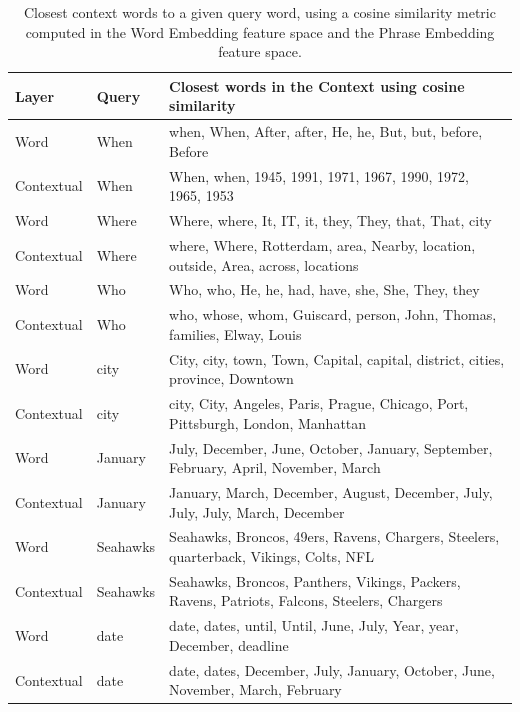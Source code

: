 \begin{table}[]
    \scriptsize
    \centering
    \begin{tabular}{ lll }
        \hline
        \textbf{Layer} & \textbf{Query} & \textbf{Closest words in the Context using cosine similarity} \\
        \hline
        \hline
        Word & When & when, When, After, after, He, he, But, but, before, Before \\
        Contextual & When & When, when, 1945, 1991, 1971, 1967, 1990, 1972, 1965, 1953 \\
        \hline
        Word & Where & Where, where, It, IT, it, they, They, that, That, city \\
        Contextual & Where & where, Where, Rotterdam, area, Nearby, location, outside, Area, across, locations \\
        \hline
        Word & Who & Who, who, He, he, had, have, she, She, They, they \\
        Contextual & Who & who, whose, whom, Guiscard, person, John, Thomas, families, Elway, Louis \\
        \hline
        Word & city & City, city, town, Town, Capital, capital, district, cities, province, Downtown \\
        Contextual & city & city, City, Angeles, Paris, Prague, Chicago, Port, Pittsburgh, London, Manhattan \\
        \hline
        Word & January & July, December, June, October, January, September, February, April, November, March \\
        Contextual & January & January, March, December, August, December, July, July, July, March, December \\
        \hline
        Word & Seahawks & Seahawks, Broncos, 49ers, Ravens, Chargers, Steelers, quarterback, Vikings, Colts, NFL \\
        Contextual & Seahawks & Seahawks, Broncos, Panthers, Vikings, Packers, Ravens, Patriots, Falcons, Steelers, Chargers \\
        \hline
        Word & date & date, dates, until, Until, June, July, Year, year, December, deadline \\
        Contextual & date & date, dates, December, July, January, October, June, November, March, February \\
        \hline
    \end{tabular}
    \caption{\small Closest context words to a given query word, using a cosine similarity metric computed in the Word Embedding feature space and the Phrase Embedding feature space.}
    \label{tab:viz_closest}
\end{table}

